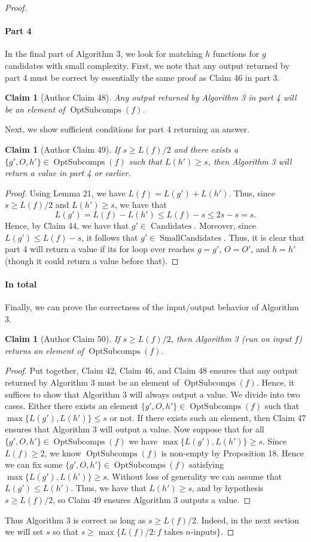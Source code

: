 \documentclass[10pt,a4paper]{article}
\newtheorem{ntclaim}[nttheorem]{Claim}
\newcommand{\Opt}{\operatorname{OptSubcomps}}
\newcommand{\Candidates}{\operatorname{Candidates}}
\begin{document}
\begin{proof}
\paragraph{Part 4}
In the final part of Algorithm 3, we look for matching $h$ functions for $g$ candidates with small complexity.
First, we note that any output returned by part 4 must be correct by essentially the same proof as Claim 46 in part 3.
\begin{ntclaim}[Author Claim 48]
Any output returned by Algorithm 3 in part 4 will be an element of $\Opt(f)$.
\end{ntclaim}
Next, we show sufficient conditions for part 4 returning an answer.
\begin{ntclaim}[Author Claim 49]
If $s\geq L(f)/2$ and there exists a $\{g',O,h'\}\in\Opt(f)$ such that $L(h')\geq s$, then Algorithm 3 will return a value in part 4 or earlier.
\end{ntclaim}
\begin{proof}
Using Lemma 21, we have $L(f)=L(g')+L(h')$. Thus, since $s\geq L(f)/2$ and $L(h')\geq s$, we have that
\[L(g')=L(f)-L(h')\leq L(f)-s\leq 2s-s=s.\]
Hence, by Claim 44, we have that $g'\in\Candidates$. Moreover, since $L(g')\leq L(f)-s$, it follows that $g'\in\operatorname{SmallCandidates}$. Thus, it is clear that part 4 will return a value if its for loop ever reaches $g=g'$, $O=O'$, and $h=h'$ (though it could return a value before that).
\end{proof}
\paragraph{In total}
Finally, we can prove the correctness of the input/output behavior of Algorithm 3.
\begin{ntclaim}[Author Claim 50]
If $s\geq L(f)/2$, then Algorithm 3 (run on input $f$) returns an element of $\Opt(f)$.
\end{ntclaim}
\begin{proof}
Put together, Claim 42, Claim 46, and Claim 48 ensures that any output returned by Algorithm 3 must be an element of $\Opt(f)$.
Hence, it suffices to show that Algorithm 3 will always output a value. We divide into two cases. Either there exists an element $\{g',O,h'\}\in\Opt(f)$ such that $\max\{L(g'),L(h')\}\leq s$ or not.
If there exists such an element, then Claim 47 ensures that Algorithm 3 will output a value.
Now suppose that for all $\{g',O,h'\}\in\Opt(f)$ we have $\max\{L(g'),L(h')\}\geq s$. Since $L(f)\geq 2$, we know $\Opt(f)$ is non-empty by Proposition 18. Hence we can fix some $\{g',O,h'\}\in\Opt(f)$ satisfying $\max\{L(g'),L(h')\}\geq s$. Without loss of generality we can assume that $L(g')\leq L(h')$. Thus, we have that $L(h')\geq s$, and by hypothesis $s\geq L(f)/2$, so Claim 49 ensures Algorithm 3 outputs a value.
\end{proof}
Thus Algorithm 3 is correct as long as $s\geq L(f)/2$. Indeed, in the next section we will set $s$ so that $s\geq\max\{L(f)/2:f\text{ takes }n\text{-inputs}\}$.


\end{proof}
\end{document}
